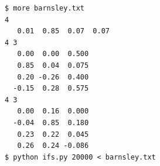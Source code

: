 \documentclass[8pt,a4paper,compress]{beamer}
\begin{document}
\begin{frame}[fragile]
\begin{minipage}{160pt}
\begin{lstlisting}[language={}]
$ more barnsley.txt
4
   0.01  0.85  0.07  0.07
4 3
   0.00  0.00  0.500
   0.85  0.04  0.075
   0.20 -0.26  0.400
  -0.15  0.28  0.575
4 3
   0.00  0.16  0.000
  -0.04  0.85  0.180
   0.23  0.22  0.045
   0.26  0.24 -0.086
$ python ifs.py 20000 < barnsley.txt
\end{lstlisting}
\end{minipage}%
\begin{minipage}{140pt}
\begin{center}
\hfill {}
\end{center}
\end{minipage}
\end{frame}
\end{document}
